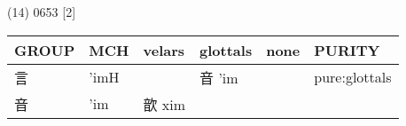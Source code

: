 \documentclass[14pt,a4paper]{scrartcl}
\begin{document}
(14) 0653 {[}2{]}

\begin{longtable}[c]{@{}llllll@{}}
\toprule
\begin{minipage}[b]{0.14\columnwidth}\raggedright\strut
GROUP
\strut\end{minipage} &
\begin{minipage}[b]{0.14\columnwidth}\raggedright\strut
MCH
\strut\end{minipage} &
\begin{minipage}[b]{0.14\columnwidth}\raggedright\strut
velars
\strut\end{minipage} &
\begin{minipage}[b]{0.14\columnwidth}\raggedright\strut
glottals
\strut\end{minipage} &
\begin{minipage}[b]{0.14\columnwidth}\raggedright\strut
none
\strut\end{minipage} &
\begin{minipage}[b]{0.14\columnwidth}\raggedright\strut
PURITY
\strut\end{minipage}\tabularnewline
\midrule
\endhead
\begin{minipage}[t]{0.14\columnwidth}\raggedright\strut
言
\strut\end{minipage} &
\begin{minipage}[t]{0.14\columnwidth}\raggedright\strut
'imH
\strut\end{minipage} &
\begin{minipage}[t]{0.14\columnwidth}\raggedright\strut
\strut\end{minipage} &
\begin{minipage}[t]{0.14\columnwidth}\raggedright\strut
音 'im
\strut\end{minipage} &
\begin{minipage}[t]{0.14\columnwidth}\raggedright\strut
\strut\end{minipage} &
\begin{minipage}[t]{0.14\columnwidth}\raggedright\strut
pure:glottals
\strut\end{minipage}\tabularnewline
\begin{minipage}[t]{0.14\columnwidth}\raggedright\strut
音
\strut\end{minipage} &
\begin{minipage}[t]{0.14\columnwidth}\raggedright\strut
'im
\strut\end{minipage} &
\begin{minipage}[t]{0.14\columnwidth}\raggedright\strut
歆 xim
\strut\end{minipage} &

\end{longtable}
\end{document}
